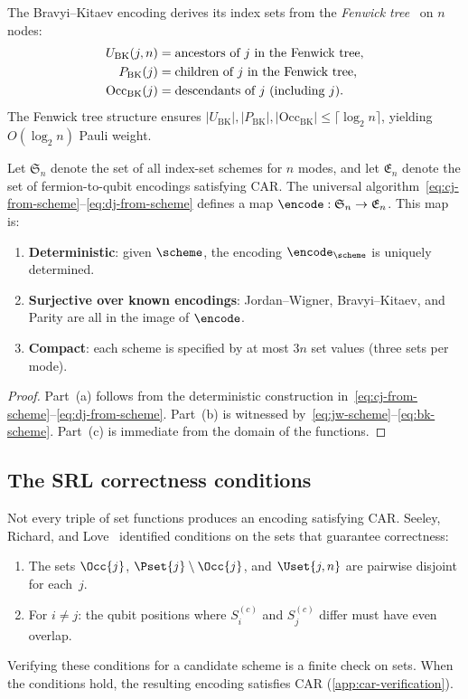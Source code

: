 The Bravyi--Kitaev encoding derives its index sets from the
\emph{Fenwick tree}~\cite{fenwick1994, seeley2012} on $n$ nodes:
\begin{align}
  U_{\text{BK}}(j, n) &= \text{ancestors of } j \text{ in the Fenwick tree}, \notag \\
  P_{\text{BK}}(j) &= \text{children of } j \text{ in the Fenwick tree}, \notag \\
  \mathrm{Occ}_{\text{BK}}(j) &= \text{descendants of } j \text{ (including } j\text{)}.
  \label{eq:bk-scheme}
\end{align}
The Fenwick tree structure ensures $|U_{\text{BK}}|, |P_{\text{BK}}|,
|\mathrm{Occ}_{\text{BK}}| \le \lceil \log_2 n \rceil$, yielding
$O(\log_2 n)$ Pauli weight.

\begin{proposition}
\label{prop:encoding-as-data}
Let $\mathfrak{S}_n$ denote the set of all index-set schemes for $n$
modes, and let $\mathfrak{E}_n$ denote the set of fermion-to-qubit
encodings satisfying CAR.  The universal
algorithm~\eqref{eq:cj-from-scheme}--\eqref{eq:dj-from-scheme} defines
a map $\encode : \mathfrak{S}_n \to \mathfrak{E}_n$.  This map is:
\begin{enumerate}
  \item[(a)] \textbf{Deterministic}: given $\scheme$, the encoding
    $\encode_\scheme$ is uniquely determined.
  \item[(b)] \textbf{Surjective over known encodings}: Jordan--Wigner,
    Bravyi--Kitaev, and Parity are all in the image of $\encode$.
  \item[(c)] \textbf{Compact}: each scheme is specified by at most
    $3n$ set values (three sets per mode).
\end{enumerate}
\end{proposition}

\begin{proof}
Part~(a) follows from the deterministic construction
in~\eqref{eq:cj-from-scheme}--\eqref{eq:dj-from-scheme}.  Part~(b) is
witnessed by~\eqref{eq:jw-scheme}--\eqref{eq:bk-scheme}.  Part~(c) is
immediate from the domain of the functions.
\end{proof}

\subsection{The SRL correctness conditions}

Not every triple of set functions produces an encoding satisfying CAR.
Seeley, Richard, and Love~\cite{seeley2012} identified conditions on
the sets that guarantee correctness:
\begin{enumerate}
  \item The sets $\Occ{j}$, $\Pset{j} \setminus \Occ{j}$, and
    $\Uset{j,n}$ are pairwise disjoint for each~$j$.
  \item For $i \neq j$: the qubit positions where $S_i^{(c)}$ and
    $S_j^{(c)}$ differ must have even overlap.
\end{enumerate}
Verifying these conditions for a candidate scheme is a finite check on
sets.  When the conditions hold, the resulting encoding satisfies CAR
(\cref{app:car-verification}).

